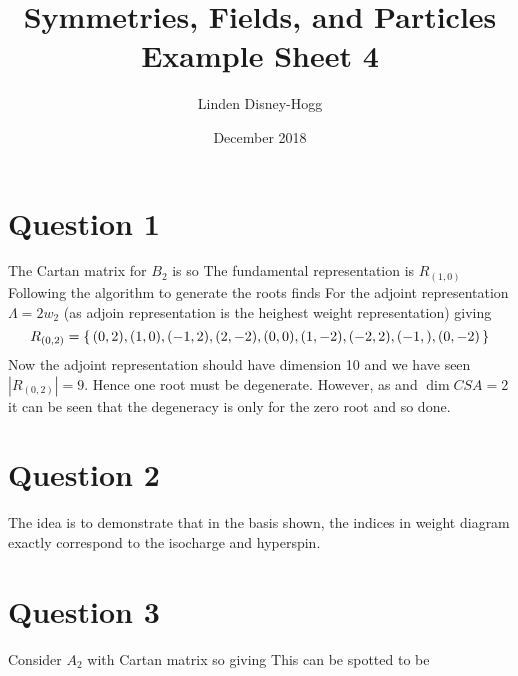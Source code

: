 \documentclass{article}
\title{Symmetries, Fields, and Particles Example Sheet 4}
\author{Linden Disney-Hogg}
\date{December 2018}
\begin{document}
\maketitle
\tableofcontents

\section{Question 1} 
The Cartan matrix for $B_2$ is 
so 
The fundamental representation is $R_{(1,0)}$
Following the algorithm to generate the roots finds 
For the adjoint representation $\Lambda = 2w_2$ (as adjoin representation is the heighest weight representation) giving 
\[
R_{(0,2)} = \set{(0,2),(1,0),(-1,2),(2,-2),(0,0),(1,-2),(-2,2),(-1,),(0,-2)}
\]
Now the adjoint representation should have dimension 10 and we have seen $|R_{(0,2)}|=9$. Hence one root must be degenerate. However, as 
and $\dim CSA  = 2$ it can be seen that the degeneracy is only for the zero root and so done. 

\section{Question 2}
The idea is to demonstrate that in the basis shown, the indices in weight diagram exactly correspond to the isocharge and hyperspin. 
\section{Question 3}
Consider $A_2$ with Cartan matrix 
so 
giving 
This can be spotted to be 
\end{document}
